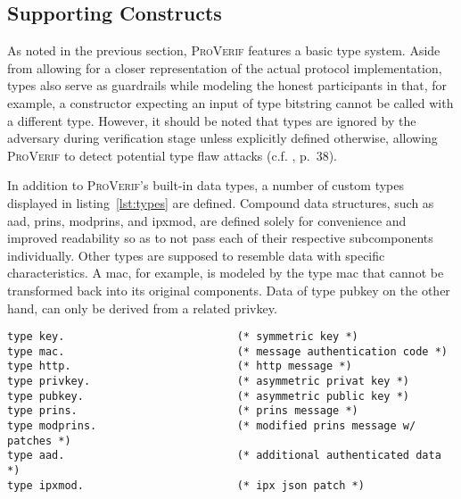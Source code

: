 \lstset{style=proverif}

\subsection{Supporting Constructs}

As noted in the previous section, \textsc{ProVerif} features a basic type system.
Aside from allowing for a closer representation of the actual protocol implementation, types also serve as guardrails while modeling the honest participants in that, for example, a constructor expecting an input of type bitstring cannot be called with a different type.
However, it should be noted that types are ignored by the adversary during verification stage unless explicitly defined otherwise, allowing \textsc{ProVerif} to detect potential type flaw attacks (c.f. \cite{blanchet2020proverif}, p.~38).

In addition to \textsc{ProVerif}'s built-in data types, a number of custom types displayed in listing~\ref{lst:types} are defined.
Compound data structures, such as {\sffamily aad}, {\sffamily prins}, {\sffamily modprins}, and {\sffamily ipxmod}, are defined solely for convenience and improved readability so as to not pass each of their respective subcomponents individually.
Other types are supposed to resemble data with specific characteristics.
A \gls{mac}, for example, is modeled by the type {\sffamily mac} that cannot be transformed back into its original components.
Data of type {\sffamily pubkey} on the other hand, can only be derived from a related {\sffamily privkey}.

\begin{lstlisting}[caption={Custom type definitions},label={lst:types},firstnumber=10]
type key.                           (* symmetric key *)
type mac.                           (* message authentication code *)
type http.                          (* http message *)
type privkey.                       (* asymmetric privat key *)
type pubkey.                        (* asymmetric public key *)
type prins.                         (* prins message *)
type modprins.                      (* modified prins message w/ patches *)
type aad.                           (* additional authenticated data *)
type ipxmod.                        (* ipx json patch *)
\end{lstlisting}


